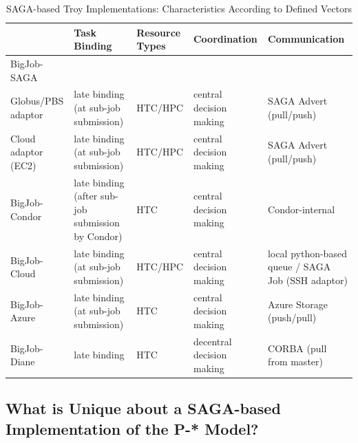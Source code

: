 \documentclass[conference,final]{IEEEtran}
\begin{document}
\begin{table}[t]
\centering
\begin{tabular}{|l|p{2.5cm}|p{2cm}|p{2cm}|p{2cm}|}
	\hline
	&\textbf{Task Binding} &\textbf{Resource Types} &\textbf{Coordina\-tion} & \textbf{Communica\-tion} \\
	\hline
	BigJob-SAGA & &&&\\
	\hline
	\hspace{4mm} Globus/PBS adaptor  &late binding (at sub-job submission)  
									 &HTC/HPC &central decision making &SAGA Advert (pull/push) \\  
	\hline
	\hspace{4mm} Cloud adaptor (EC2) &late binding (at sub-job submission)  
									 &HTC/HPC &central decision making &SAGA Advert (pull/push) \\ 
    \hline
   BigJob-Condor &late binding (after sub-job submission by Condor) &HTC &central decision making &Condor-internal \\
	\hline
 	BigJob-Cloud &late binding (at sub-job submission) &HTC/HPC &central decision making 
				 &local python-based queue / SAGA Job (SSH adaptor) \\ 
	\hline
	BigJob-Azure &late binding (at sub-job submission)
	             &HTC &central decision making &Azure Storage (push/pull) \\ 
	\hline
    BigJob-Diane &late binding  &HTC &decentral decision making &CORBA (pull from master) \\ 
	\hline	
\end{tabular}
\caption{SAGA-based Troy Implementations: Characteristics According to Defined Vectors} \label{tab:pilotjob_overview}
\end{table}		


\subsection{What is Unique about a SAGA-based Implementation of the
  P-* Model?}
\end{document}
